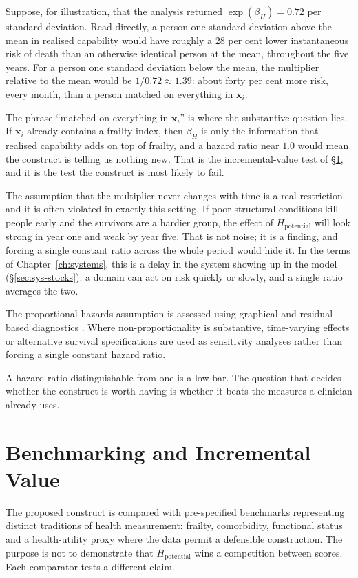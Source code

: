 Suppose, for illustration, that the analysis returned $\exp(\beta_H)=0.72$ per standard deviation. Read
directly, a person one standard deviation above the mean in realised capability
would have roughly a $28$ per cent lower instantaneous risk of death than an otherwise
identical person at the mean, throughout the five years. For a person one
standard deviation below the mean, the multiplier relative to the mean would be
$1/0.72\approx1.39$: about forty per cent more risk, every month, than a
person matched on everything in $\mathbf{x}_i$.

The phrase ``matched on everything in $\mathbf{x}_i$'' is where the substantive
question lies. If $\mathbf{x}_i$ already contains a frailty index, then
$\beta_H$ is only the information that realised capability adds on top of
frailty, and a hazard ratio near $1.0$ would mean the construct is telling us
nothing new. That is the incremental-value test of \S\ref{sec:performance}, and
it is the test the construct is most likely to fail.

The assumption that the multiplier never changes with time is a real
restriction and it is often violated in exactly this setting. If poor
structural conditions kill people early and the survivors are a hardier group,
the effect of $H_{\text{potential}}$ will look strong in year one and weak by
year five. That is not noise; it is a finding, and forcing a single constant
ratio across the whole period would hide it. In the terms of
Chapter~\ref{ch:systems}, this is a delay in the system showing up in the
model (\S\ref{sec:sys-stocks}): a domain can act on risk quickly or slowly, and
a single ratio averages the two.

The proportional-hazards assumption is assessed using graphical and residual-based diagnostics \citep{grambsch_1994}. Where non-proportionality is substantive, time-varying effects or alternative survival specifications are used as sensitivity analyses rather than forcing a single constant hazard ratio.

A hazard ratio distinguishable from one is a low bar. The question that decides whether the construct is worth having is whether it beats the measures a clinician already uses.

\section{Benchmarking and Incremental Value}
\label{sec:performance}

The proposed construct is compared with pre-specified benchmarks representing distinct traditions of health measurement: frailty, comorbidity, functional status and a health-utility proxy where the data permit a defensible construction. The purpose is not to demonstrate that $H_{\text{potential}}$ wins a competition between scores. Each comparator tests a different claim.

